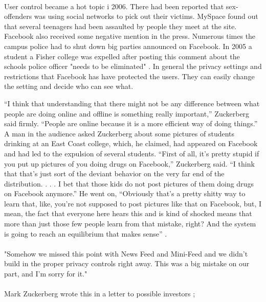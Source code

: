 \paragraph{}
User control became a hot topic i 2006. There had been reported that sex- offenders was using social networks to pick out their victims. MySpace found out that several teenagers had been assaulted by people they meet at the site. Facebook also received some negative mention in the press. Numerous times the campus police had to shut down big parties announced on Facebook. In 2005 a student a Fisher college was expelled after posting this comment about the schools police officer "needs to be eliminated" \cite{MeMedia}.  
In general the privacy settings and restrictions that Facebook has have protected the users. They can easily change the setting and decide who can see what.

“I think that understanding that there might not be any difference between what people are doing online and offline is something really important,” Zuckerberg said firmly. “People are online because it is a more efficient way of doing things.” A man in the audience asked Zuckerberg about some pictures of students drinking at an East Coast college, which, he claimed, had appeared on Facebook and had led to the expulsion of several students. “First of all, it’s pretty stupid if you put up pictures of you doing drugs on Facebook,” Zuckerberg said. “I think that that’s just sort of the deviant behavior on the very far end of the distribution. . . . I bet that those kids do not post pictures of them doing drugs on Facebook anymore.” He went on, “Obviously that’s a pretty shitty way to learn that, like, you’re not supposed to post pictures like that on Facebook, but, I mean, the fact that everyone here hears this and is kind of shocked means that more than just those few people learn from that mistake, right? And the system is going to reach an equilibrium that makes sense” \cite{MeMedia}.

\paragraph{}
"Somehow we missed this point with News Feed and Mini-Feed and we didn't build in the proper privacy controls right away. This was a big mistake on our part, and I'm sorry for it." \cite{FacebookStoryInceptionToIsp}

\paragraph{}
Mark Zuckerberg wrote this in a letter to possible investors \cite{LetterToInvestors};


